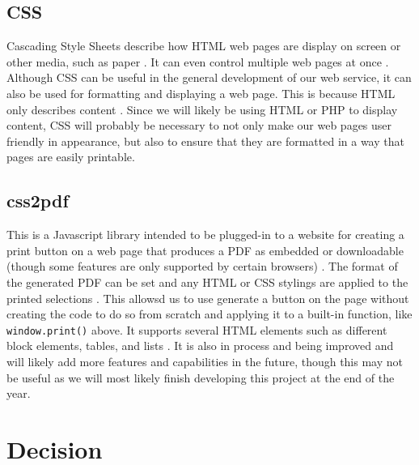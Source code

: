 \documentclass{IEEEtran}
\begin{document}
\subsection{CSS} %
Cascading Style Sheets describe how HTML web pages are display on screen or other media, such as paper \cite{css}.
It can even control multiple web pages at once \cite{css}.
Although CSS can be useful in the general development of our web service, it can also be used for formatting and displaying a web page.
This is because HTML only describes content \cite{css}.
Since we will likely be using HTML or PHP to display content, CSS will probably be necessary to not only make our web pages user friendly in appearance, but also to ensure that they are formatted in a way that pages are easily printable.
\subsection{css2pdf} %
This is a Javascript library intended to be plugged-in to a website for creating a print button on a web page that produces a PDF as embedded or downloadable (though some features are only supported by certain browsers) \cite{css2pdf}.
The format of the generated PDF can be set and any HTML or CSS stylings are applied to the printed selections \cite{css2pdf}.
This allowsd us to use generate a button on the page without creating the code to do so from scratch and applying it to a built-in function, like \texttt{window.print()} above.
It supports several HTML elements such as different block elements, tables, and lists \cite{css2pdf_home}.
It is also in process and being improved and will likely add more features and capabilities in the future, though this may not be useful as we will most likely finish developing this project at the end of the year.

\section{Decision}
\end{document}
